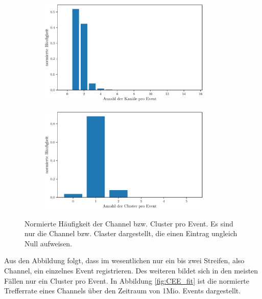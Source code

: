 \begin{figure}[H]
\centering
\begin{subfigure}{.5\textwidth}
	\centering
	\includegraphics[width=0.9\textwidth]{build/Quellenmessung_frequeny_channel.pdf}
	\caption{}
	\label{fig:frequency_channel}
\end{subfigure}%
\begin{subfigure}{.5\textwidth}
	\centering
	\includegraphics[width=0.9\textwidth]{build/Quellenmessung_frequeny_cluster.pdf}
	\caption{}
	\label{fig:frequency_cluster}
\end{subfigure}
\caption{Normierte Häufigkeit der Channel bzw. Cluster pro Event. Es sind nur die Channel bzw. Claster dargestellt, die einen Eintrag ungleich Null aufweisen.}
\label{fig:großer_quellenscan_1}
\end{figure}

Aus den Abbildung folgt, dass im wesentlichen nur ein bis zwei Streifen, also Channel, ein einzelnes Event registrieren. Des weiteren bildet sich in den meisten Fällen nur ein Cluster pro Event. In Abbildung \ref{fig:CEE_fit} ist die normierte Trefferrate eines Channels über den Zeitraum von 1Mio. Events dargestellt.


